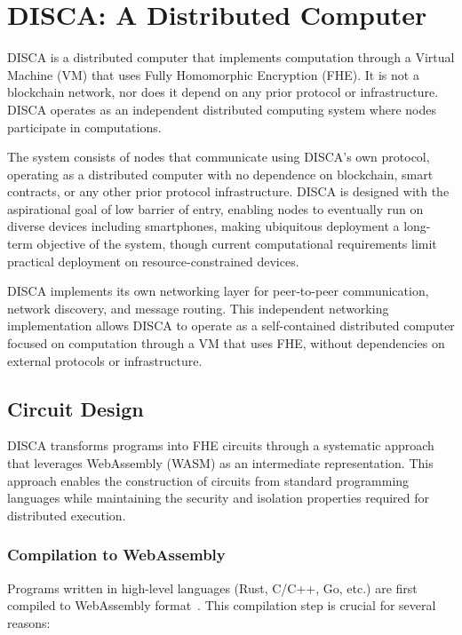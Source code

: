 \documentclass[12pt,a4paper]{article}
\begin{document}
\section{DISCA: A Distributed Computer}

DISCA is a distributed computer that implements computation through a Virtual Machine (VM) that uses Fully Homomorphic Encryption (FHE).
It is not a blockchain network, nor does it depend on any prior protocol or infrastructure.
DISCA operates as an independent distributed computing system where nodes participate in computations.

The system consists of nodes that communicate using DISCA's own protocol, operating as a distributed computer with no dependence on blockchain, smart contracts, or any other prior protocol infrastructure.
DISCA is designed with the aspirational goal of low barrier of entry, enabling nodes to eventually run on diverse devices including smartphones, making ubiquitous deployment a long-term objective of the system, though current computational requirements limit practical deployment on resource-constrained devices.

DISCA implements its own networking layer for peer-to-peer communication, network discovery, and message routing.
This independent networking implementation allows DISCA to operate as a self-contained distributed computer focused on computation through a VM that uses FHE, without dependencies on external protocols or infrastructure.

\subsection{Circuit Design}

DISCA transforms programs into FHE circuits through a systematic approach that leverages WebAssembly (WASM) as an intermediate representation.
This approach enables the construction of circuits from standard programming languages while maintaining the security and isolation properties required for distributed execution.

\subsubsection{Compilation to WebAssembly}

Programs written in high-level languages (Rust, C/C++, Go, etc.) are first compiled to WebAssembly format~\cite{wasm_spec}.
This compilation step is crucial for several reasons:
\end{document}
